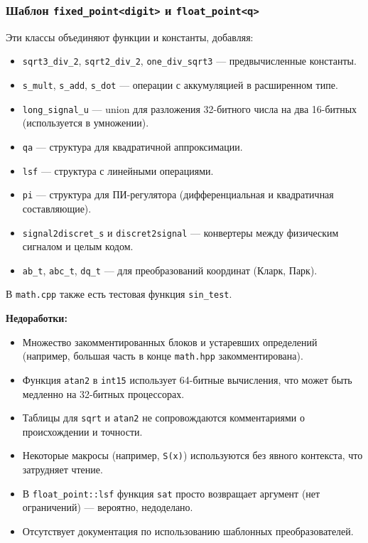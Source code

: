 \documentclass[a4paper,12pt]{article}
\begin{document}
\subsubsection{Шаблон \texttt{fixed\_point<digit>} и \texttt{float\_point<q>}}

Эти классы объединяют функции и константы, добавляя:

\begin{itemize}
    \item \texttt{sqrt3\_div\_2}, \texttt{sqrt2\_div\_2}, \texttt{one\_div\_sqrt3} — предвычисленные константы.
    \item \texttt{s\_mult}, \texttt{s\_add}, \texttt{s\_dot} — операции с аккумуляцией в расширенном типе.
    \item \texttt{long\_signal\_u} — union для разложения 32-битного числа на два 16-битных (используется в умножении).
    \item \texttt{qa} — структура для квадратичной аппроксимации.
    \item \texttt{lsf} — структура с линейными операциями.
    \item \texttt{pi} — структура для ПИ-регулятора (дифференциальная и квадратичная составляющие).
    \item \texttt{signal2discret\_s} и \texttt{discret2signal} — конвертеры между физическим сигналом и целым кодом.
    \item \texttt{ab\_t}, \texttt{abc\_t}, \texttt{dq\_t} — для преобразований координат (Кларк, Парк).
\end{itemize}

В \texttt{math.cpp} также есть тестовая функция \texttt{sin\_test}.

\textbf{Недоработки:}
\begin{itemize}
    \item Множество закомментированных блоков и устаревших определений (например, большая часть в конце \texttt{math.hpp} закомментирована).
    \item Функция \texttt{atan2} в \texttt{int15} использует 64-битные вычисления, что может быть медленно на 32-битных процессорах.
    \item Таблицы для \texttt{sqrt} и \texttt{atan2} не сопровождаются комментариями о происхождении и точности.
    \item Некоторые макросы (например, \texttt{S(x)}) используются без явного контекста, что затрудняет чтение.
    \item В \texttt{float\_point::lsf} функция \texttt{sat} просто возвращает аргумент (нет ограничений) — вероятно, недоделано.
    \item Отсутствует документация по использованию шаблонных преобразователей.
\end{itemize}
\end{document}
